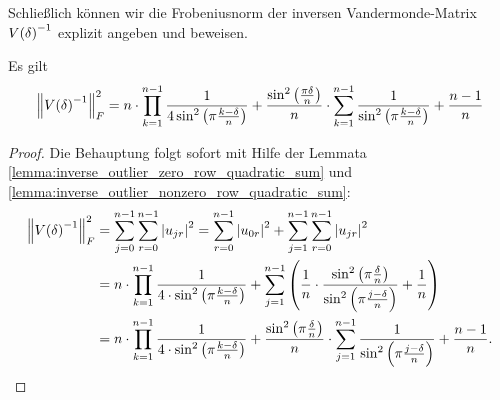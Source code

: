 Schließlich können wir die Frobeniusnorm der inversen Vandermonde-Matrix
$V \! \left( \delta \right)^{-1}$ explizit angeben und beweisen.
\begin{theorem}
    Es gilt
    \begin{equation}
        \left\lVert  V \! \left( \delta \right)^{-1}  \right\rVert_F^2
        = n \cdot \prod_{k=1}^{n-1} \frac{1}{4 \sin^2 \left( \pi \frac{k-\delta}{n} \right)}
          + \frac{\sin^2 \left( \frac{\pi \delta}{n} \right)}{n} \cdot \sum_{k=1}^{n-1} \frac{1}{\sin^2 \left( \pi \frac{k-\delta}{n} \right)}
          + \frac{n-1}{n}
    \end{equation}
\end{theorem}
\begin{proof}
    Die Behauptung folgt sofort mit Hilfe der Lemmata
    \ref{lemma:inverse_outlier_zero_row_quadratic_sum} und
    \ref{lemma:inverse_outlier_nonzero_row_quadratic_sum}:
    \[
        \begin{split}
            \left\lVert  V \! \left( \delta \right)^{-1}  \right\rVert_F^2
            &= \sum_{j=0}^{n-1} \sum_{r=0}^{n-1} \left\lvert u_{jr} \right\rvert^2
             = \sum_{r=0}^{n-1} \left\lvert u_{0r} \right\rvert^2
             + \sum_{j=1}^{n-1} \sum_{r=0}^{n-1} \left\lvert u_{jr} \right\rvert^2\\
            &= n \cdot \prod_{k=1}^{n-1} \frac{1}{4 \cdot \sin^2 \left( \pi \frac{k-\delta}{n} \right)}
             + \sum_{j=1}^{n-1} \left( \frac{1}{n} \cdot \frac{\sin^2 \left( \pi \frac{\delta}{n} \right)}{\sin^2 \left( \pi \frac{j - \delta}{n} \right)}
             + \frac{1}{n} \right)\\
            &= n \cdot \prod_{k=1}^{n-1} \frac{1}{4 \cdot \sin^2 \left( \pi \frac{k-\delta}{n} \right)}
             + \frac{\sin^2 \left( \pi \frac{\delta}{n} \right)}{n} \cdot \sum_{j=1}^{n-1} \frac{1}{\sin^2 \left( \pi \frac{j - \delta}{n} \right)}
             + \frac{n-1}{n}.
         \end{split}
     \]
\end{proof}
